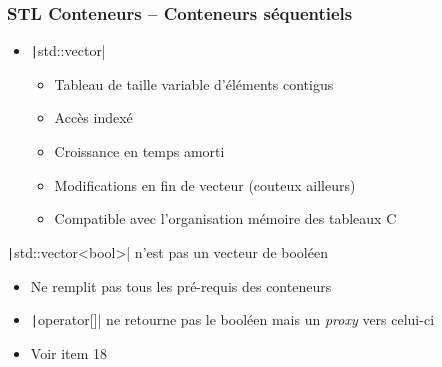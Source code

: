 \documentclass[C++.tex]{subfiles}
\begin{document}
\begin{frame}[fragile]
	\frametitle{STL Conteneurs -- Conteneurs séquentiels}
	\begin{itemize}
		\item \texttt|std::vector|
		\begin{itemize}
			\item Tableau de taille variable d'éléments contigus
			\item Accès indexé
			\item Croissance en temps amorti
			\item Modifications en fin de vecteur (couteux ailleurs)


			\item Compatible avec l'organisation mémoire des tableaux C

		\end{itemize}
	\end{itemize}

	\begin{alertblock}{\texttt|std::vector<bool>| n'est pas un vecteur de booléen}
		\begin{itemize}
			\item Ne remplit pas tous les pré-requis des conteneurs
			\item \texttt|operator[]| ne retourne pas le booléen mais un \textit{proxy} vers celui-ci
			\item Voir \cite{effStl} item 18

		\end{itemize}
	\end{alertblock}
\end{frame}
\end{document}
